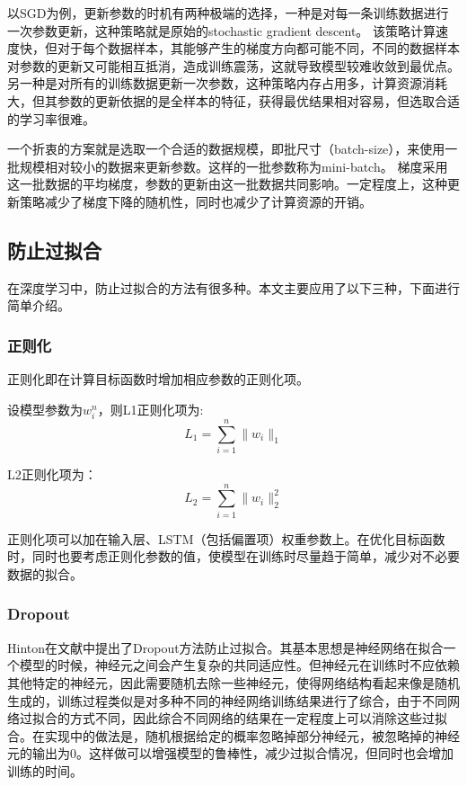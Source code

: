 以SGD为例，更新参数的时机有两种极端的选择，一种是对每一条训练数据进行一次参数更新，这种策略就是原始的stochastic gradient descent。
该策略计算速度快，但对于每个数据样本，其能够产生的梯度方向都可能不同，不同的数据样本对参数的更新又可能相互抵消，造成训练震荡，这就导致模型较难收敛到最优点。
另一种是对所有的训练数据更新一次参数，这种策略内存占用多，计算资源消耗大，但其参数的更新依据的是全样本的特征，获得最优结果相对容易，但选取合适的学习率很难。

一个折衷的方案就是选取一个合适的数据规模，即批尺寸（batch-size），来使用一批规模相对较小的数据来更新参数。这样的一批参数称为mini-batch。
梯度采用这一批数据的平均梯度，参数的更新由这一批数据共同影响。一定程度上，这种更新策略减少了梯度下降的随机性，同时也减少了计算资源的开销。
\subsection{防止过拟合}
在深度学习中，防止过拟合的方法有很多种。本文主要应用了以下三种，下面进行简单介绍。
\subsubsection{正则化}
正则化即在计算目标函数时增加相应参数的正则化项。

设模型参数为$w_i^n$，则L1正则化项为:
\begin{equation}
    L_1 = \sum^n_{i=1}\lVert w_i \rVert_1
\end{equation}

L2正则化项为：
\begin{equation}
    L_2 = \sum^n_{i=1}\lVert w_i \rVert_2^2
\end{equation}

正则化项可以加在输入层、LSTM（包括偏置项）权重参数上。在优化目标函数时，同时也要考虑正则化参数的值，使模型在训练时尽量趋于简单，减少对不必要数据的拟合。
\subsubsection{Dropout}
Hinton在文献\citep{srivastava2014dropout}中提出了Dropout方法防止过拟合。其基本思想是神经网络在拟合一个模型的时候，神经元之间会产生复杂的共同适应性。但神经元在训练时不应依赖其他特定的神经元，因此需要随机去除一些神经元，使得网络结构看起来像是随机生成的，训练过程类似是对多种不同的神经网络训练结果进行了综合，由于不同网络过拟合的方式不同，因此综合不同网络的结果在一定程度上可以消除这些过拟合。在实现中的做法是，随机根据给定的概率忽略掉部分神经元，被忽略掉的神经元的输出为0。这样做可以增强模型的鲁棒性，减少过拟合情况，但同时也会增加训练的时间。

